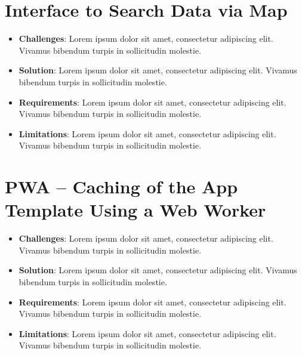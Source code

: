 \documentclass[11pt, a4paper]{article}
\begin{document}
\section{Interface to Search Data via Map}
\begin{itemize}
  \item \textbf{Challenges}: Lorem ipsum dolor sit amet, consectetur adipiscing elit. Vivamus
  bibendum turpis in sollicitudin molestie.
  \item \textbf{Solution}: Lorem ipsum dolor sit amet, consectetur adipiscing elit. Vivamus bibendum
  turpis in sollicitudin molestie.
  \item \textbf{Requirements}: Lorem ipsum dolor sit amet, consectetur adipiscing elit. Vivamus
  bibendum turpis in sollicitudin molestie.
  \item \textbf{Limitations}: Lorem ipsum dolor sit amet, consectetur adipiscing elit. Vivamus
  bibendum turpis in sollicitudin molestie.
\end{itemize}

\section{PWA – Caching of the App Template Using a Web Worker}
\begin{itemize}
  \item \textbf{Challenges}: Lorem ipsum dolor sit amet, consectetur adipiscing elit. Vivamus
  bibendum turpis in sollicitudin molestie.
  \item \textbf{Solution}: Lorem ipsum dolor sit amet, consectetur adipiscing elit. Vivamus bibendum
  turpis in sollicitudin molestie.
  \item \textbf{Requirements}: Lorem ipsum dolor sit amet, consectetur adipiscing elit. Vivamus
  bibendum turpis in sollicitudin molestie.
  \item \textbf{Limitations}: Lorem ipsum dolor sit amet, consectetur adipiscing elit. Vivamus
  bibendum turpis in sollicitudin molestie.
\end{itemize}
\end{document}
